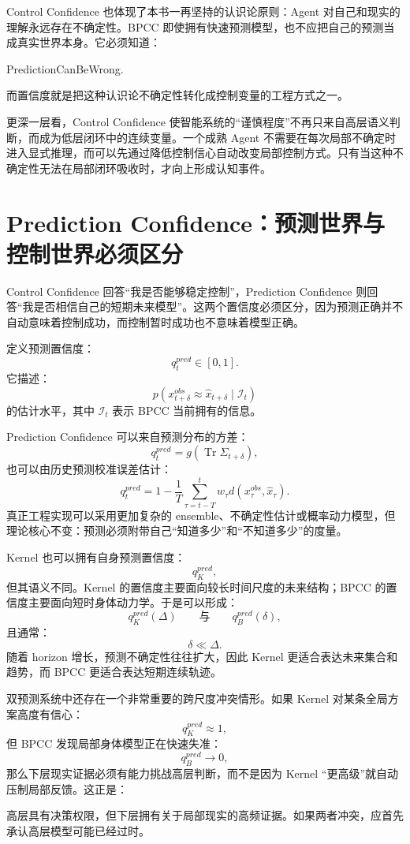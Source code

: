 Control Confidence 也体现了本书一再坚持的认识论原则：Agent 对自己和现实的理解永远存在不确定性。BPCC 即使拥有快速预测模型，也不应把自己的预测当成真实世界本身。它必须知道：
\begin{statementbox}
PredictionCanBeWrong.
\end{statementbox}
而置信度就是把这种认识论不确定性转化成控制变量的工程方式之一。

更深一层看，Control Confidence 使智能系统的“谨慎程度”不再只来自高层语义判断，而成为低层闭环中的连续变量。一个成熟 Agent 不需要在每次局部不确定时进入显式推理，而可以先通过降低控制信心自动改变局部控制方式。只有当这种不确定性无法在局部闭环吸收时，才向上形成认知事件。

\section{Prediction Confidence：预测世界与控制世界必须区分}

Control Confidence 回答“我是否能够稳定控制”，Prediction Confidence 则回答“我是否相信自己的短期未来模型”。这两个置信度必须区分，因为预测正确并不自动意味着控制成功，而控制暂时成功也不意味着模型正确。

定义预测置信度：
\[
q_t^{pred}\in[0,1].
\]
它描述：
\[
p
\left(
x_{t+\delta}^{obs}
\approx
\hat x_{t+\delta}
\mid
\mathcal I_t
\right)
\]
的估计水平，其中 $\mathcal I_t$ 表示 BPCC 当前拥有的信息。

Prediction Confidence 可以来自预测分布的方差：
\[
q_t^{pred}
=
g
\left(
\operatorname{Tr}
\Sigma_{t+\delta}
\right),
\]
也可以由历史预测校准误差估计：
\[
q_t^{pred}
=
1-
\frac{1}{T}
\sum_{\tau=t-T}^{t}
w_\tau
d
\left(
x_\tau^{obs},
\hat x_\tau
\right).
\]
真正工程实现可以采用更加复杂的 ensemble、不确定性估计或概率动力模型，但理论核心不变：预测必须附带自己“知道多少”和“不知道多少”的度量。

Kernel 也可以拥有自身预测置信度：
\[
q_K^{pred},
\]
但其语义不同。Kernel 的置信度主要面向较长时间尺度的未来结构；BPCC 的置信度主要面向短时身体动力学。于是可以形成：
\[
q_K^{pred}(\Delta)
\qquad\text{与}\qquad
q_B^{pred}(\delta),
\]
且通常：
\[
\delta\ll\Delta.
\]
随着 horizon 增长，预测不确定性往往扩大，因此 Kernel 更适合表达未来集合和趋势，而 BPCC 更适合表达短期连续轨迹。

双预测系统中还存在一个非常重要的跨尺度冲突情形。如果 Kernel 对某条全局方案高度有信心：
\[
q_K^{pred}\approx1,
\]
但 BPCC 发现局部身体模型正在快速失准：
\[
q_B^{pred}\rightarrow0,
\]
那么下层现实证据必须有能力挑战高层判断，而不是因为 Kernel “更高级”就自动压制局部反馈。这正是：
\begin{statementbox}
\centering
{}
\end{statementbox}
高层具有决策权限，但下层拥有关于局部现实的高频证据。如果两者冲突，应首先承认高层模型可能已经过时。

